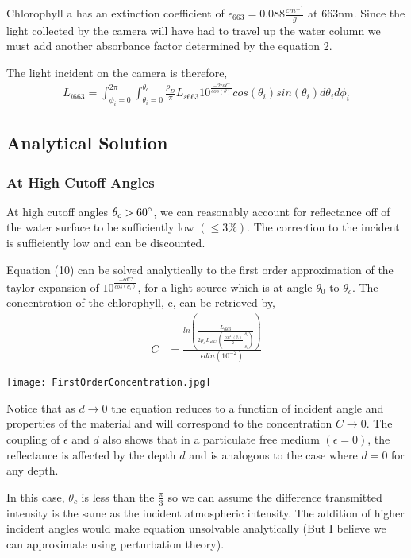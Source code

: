 \documentclass{article}
\begin{document}
Chlorophyll a has an extinction coefficient of $ \epsilon_{663} = 0.088 \frac{cm^{-1}}{g}$ at 663nm.
Since the light collected by the camera will have had to travel up the water column we must add
another absorbance factor determined by the equation 2.

The light incident on the camera is therefore,
\begin{align}
  L_{i 663} = \int^{2\pi}_{\phi_i = 0}\int^{\theta_c}_{\theta_i = 0}
  \frac{\rho_D}{\pi}  L_{s 663} 10^\frac{-2\epsilon d C}{cos(\theta)}cos(\theta_i)sin(\theta_i)d\theta_i d\phi_i
\end{align}
\subsection{Analytical Solution}
\subsubsection{At High Cutoff Angles}
At high cutoff angles $ \theta_c > 60 \degree$, we can reasonably account for reflectance off
of the water surface to be sufficiently low $ (\leq 3\%)$. The correction to the incident is
sufficiently low and can be discounted.

Equation (10) can be solved analytically to the first order approximation of the taylor expansion of
$10^{\frac{-\epsilon dC}{cos(\theta_i)}}$, for a light source which is at angle $\theta_0$ to $ \theta_{c}$.
The concentration of the chlorophyll, c, can be retrieved by,
\begin{align}
  C &= \frac{ln \left (\frac{L_{i663}}{2\rho_dL_{s663} \left(\left. \frac{\cos^2(\theta_i)}{2} \right \rvert_{\theta_0}^{\theta_c}\right) } \right)}{\epsilon d ln(10^{-2})}
\end{align}

\begin{center}
  \texttt{[image: FirstOrderConcentration.jpg]}
\end{center}
Notice that as $d \rightarrow 0 $ the equation reduces to a function of incident angle and properties
of the material and will correspond to the concentration $ C \rightarrow 0 $. The coupling
of $ \epsilon$ and $d$ also shows that in a particulate free medium $(\epsilon = 0)$, the
reflectance is affected by the depth $ d$ and is analogous to the case where $ d = 0$ for
any depth.

In this case, $ \theta_c$ is less than the $ \frac{\pi}{3}$ so we can assume the
difference transmitted intensity is the same as the incident atmospheric intensity. The addition
of higher incident angles would make equation unsolvable analytically
(But I believe we can approximate using perturbation theory).
\end{document}
